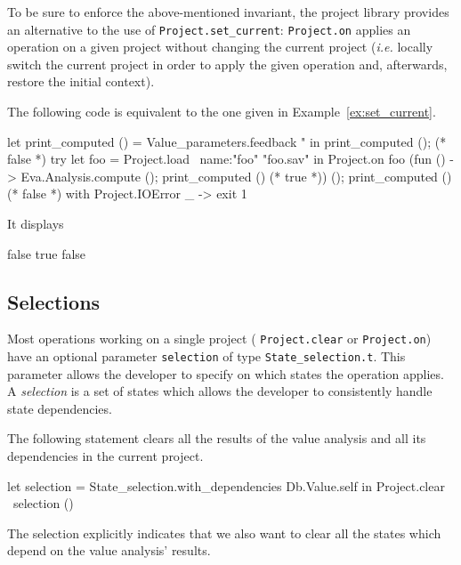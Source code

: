 To be sure to enforce the above-mentioned invariant, the project library
provides an alternative to the use of
\texttt{Project.set\_current}:
\texttt{Project.on} applies an operation on a
given project without changing the current project (\emph{i.e.} locally switch
the current project in order to apply the given operation and, afterwards,
restore the initial context).
\begin{example}
The following code is equivalent to the one given in
Example~\ref{ex:set_current}.
\begin{ocamlcode}
let print_computed () =
  Value_parameters.feedback "%
in
print_computed ();   (* false *)
try
  let foo = Project.load ~name:"foo" "foo.sav" in
  Project.on foo
    (fun () -> Eva.Analysis.compute (); print_computed () (* true *)) ();
  print_computed ()    (* false *)
with Project.IOError _ ->
  exit 1
\end{ocamlcode}
It displays
\begin{shell}
false
true
false
\end{shell}
\end{example}

\subsection{Selections}\label{proj:selection}

Most operations working on a single project (\eg
\texttt{Project.clear} or
\texttt{Project.on}) have an optional parameter
\texttt{selection} of type
\texttt{State\_selection.t}. This parameter allows the
developer to specify on which states the operation
applies. A \emph{selection} is a set of states which allows the developer to
consistently handle state dependencies.
\begin{example}
  The following statement clears all the results of the value analysis and all
  its dependencies in the current project.
\begin{ocamlcode}
let selection = State_selection.with_dependencies Db.Value.self in
Project.clear ~selection ()
\end{ocamlcode}
The selection explicitly indicates that we also want to clear all the states
which depend on the value analysis' results.
\end{example}

